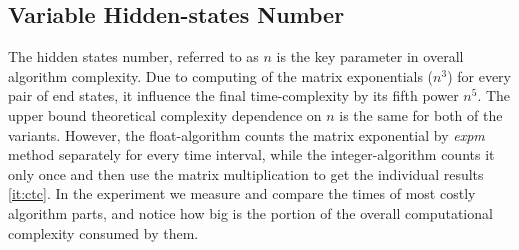 \documentclass[thesis=M,english]{FITthesis}[2012/10/20]
\begin{document}
\subsection{Variable Hidden-states Number}

The hidden states number, referred to as $n$ is the key parameter in overall algorithm complexity. Due to computing of the matrix exponentials ($n^3$) for every pair of end states, it influence the final time-complexity by its fifth power $n^5$. The upper bound theoretical complexity dependence on $n$ is the same for both of the variants. However, the float-algorithm counts the matrix exponential by \textit{expm} method separately for every time interval, while the integer-algorithm counts it only once and then use the matrix multiplication to get the individual results \ref{it:ctc}. In the experiment we measure and compare the times of most costly algorithm parts, and notice how big is the portion of the overall computational complexity consumed by them. 
\end{document}
